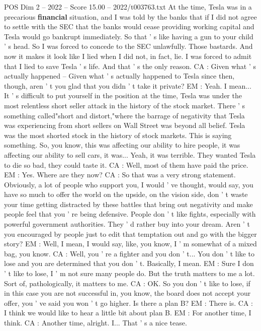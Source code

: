 \begin{textsample}{POS Dim 2 – 2022 – Score 15.00 – 2022/t003763.txt}
At the time, Tesla was in a precarious \textbf{financial} situation, and I was told by the banks that if I did not agree to settle with the SEC that the banks would cease providing working capital and Tesla would go bankrupt immediately.
So that ' s like having a gun to your child ' s head.
So I was forced to concede to the SEC unlawfully.
Those bastards.
And now it makes it look like I lied when I did not, in fact, lie.
I was forced to admit that I lied to save Tesla ' s life.
And that ' s the only reason.
CA : Given what ' s actually happened -- Given what ' s actually happened to Tesla since then, though, aren ' t you glad that you didn ' t take it private?
EM : Yeah.
I mean...
It ' s difficult to put yourself in the position at the time, Tesla was under the most relentless short seller attack in the history of the stock market.
There ' s something called"short and distort,"where the barrage of negativity that Tesla was experiencing from short sellers on Wall Street was beyond all belief.
Tesla was the most shorted stock in the history of stock markets.
This is saying something.
So, you know, this was affecting our ability to hire people, it was affecting our ability to sell cars, it was...
Yeah, it was terrible.
They wanted Tesla to die so bad, they could taste it.
CA : Well, most of them have paid the price.
EM : Yes.
Where are they now?
CA : So that was a very strong statement.
Obviously, a lot of people who support you, I would ' ve thought, would say, you have so much to offer the world on the upside, on the vision side, don ' t waste your time getting distracted by these battles that bring out negativity and make people feel that you ' re being defensive.
People don ' t like fights, especially with powerful government authorities.
They ' d rather buy into your dream.
Aren ' t you encouraged by people just to edit that temptation out and go with the bigger story?
EM : Well, I mean, I would say, like, you know, I ' m somewhat of a mixed bag, you know.
CA : Well, you ' re a fighter and you don ' t...
You don ' t like to lose and you are determined that you don ' t.
Basically, I mean.
EM : Sure I don ' t like to lose, I ' m not sure many people do.
But the truth matters to me a lot.
Sort of, pathologically, it matters to me.
CA : OK.
So you don ' t like to lose, if in this case you are not successful in, you know, the board does not accept your offer, you ' ve said you won ' t go higher.
Is there a plan B?
EM : There is.
CA : I think we would like to hear a little bit about plan B.
EM : For another time, I think.
CA : Another time, alright.
I...
That ' s a nice tease.

\end{textsample}
